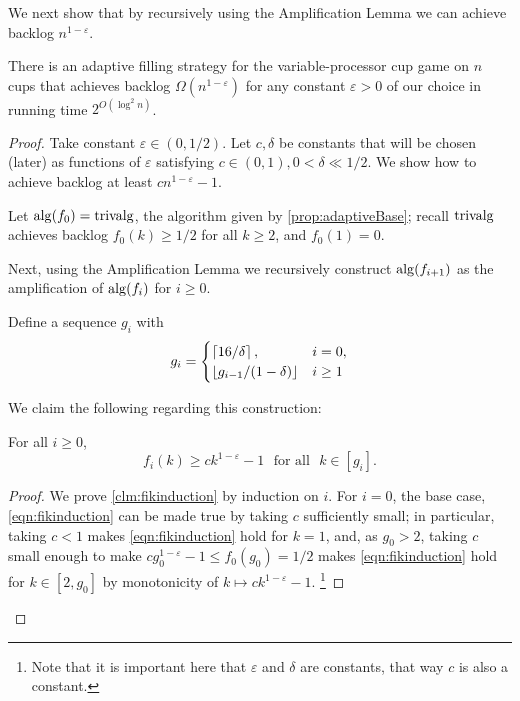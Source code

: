 We next show that by recursively using the Amplification Lemma we
can achieve backlog $n^{1 - \varepsilon}$.
\begin{theorem}
  \label{thm:adaptivePoly}
  There is an adaptive filling strategy for the variable-processor cup game on
  $n$ cups that achieves backlog $\Omega(n^{1-\varepsilon})$ for any constant
  $\varepsilon > 0$ of our choice in running time $2^{O(\log^2 n)}$.
\end{theorem}
\begin{proof}
  Take constant $\varepsilon \in (0,1/2)$. Let $c, \delta$ be
  constants that will be chosen (later) as functions of
  $\varepsilon$ satisfying $c\in (0,1), 0 < \delta \ll 1/2$.
  We show how to achieve backlog at least $cn^{1-\varepsilon}-1$.

 Let $\operatorname{\text{\textup{alg}}}(f_0)=\operatorname{\text{\textup{trivalg}}}$, the algorithm given by
 \cref{prop:adaptiveBase}; recall $\operatorname{\text{\textup{trivalg}}}$ achieves backlog $f_0(k)
 \ge 1/2$ for all $k \ge 2$, and $f_0(1) = 0$. 

  Next, using the Amplification Lemma we recursively construct
  $\operatorname{\text{\textup{alg}}}(f_{i+1})$ as the amplification of $\operatorname{\text{\textup{alg}}}(f_{i})$ for $i\ge 0$. 

  Define a sequence $g_i$ with 
  $$ g_i = \begin{cases}
    \left\lceil 16/\delta \right\rceil,  & i = 0,\\
    \left\lfloor g_{i-1}/(1-\delta) \right\rfloor & i \ge 1
  \end{cases} $$

  We claim the following regarding this construction:
  \begin{clm}
    \label{clm:fikinduction}
    For all $i\ge0$,
    \begin{equation}
      f_i(k) \ge ck^{1-\varepsilon}-1\,\, \text{ for all }\,\, k\in [g_{i}].
    \label{eqn:fikinduction}
    \end{equation}
  \end{clm}
  \begin{proof}
  We prove \cref{clm:fikinduction} by induction on $i$.
  For $i=0$, the base case, \eqref{eqn:fikinduction} can
  be made true by taking $c$ sufficiently small; in particular,
  taking $c<1$ makes \eqref{eqn:fikinduction} hold for $k = 1$,
  and, as $g_0 > 2$, taking $c$ small enough to make $c
  g_0^{1-\varepsilon} -1 \le f_0(g_0) = 1/2$ makes
  \eqref{eqn:fikinduction} hold for $k\in [2, g_0]$ by
  monotonicity of $k \mapsto ck^{1-\varepsilon}-1$. \footnote{Note
  that it is important here that $\varepsilon$ and
  $\delta$ are constants, that way $c$ is also a constant.}


\end{proof}
\end{proof}
